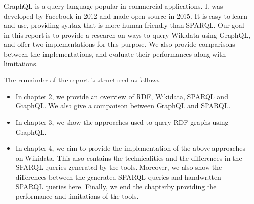 GraphQL is a query language popular in commercial applications. It was developed by Facebook in 2012 and made open source in 2015. It is easy to learn and use, providing syntax that is more human friendly than SPARQL. Our goal in this report is to provide a research on ways to query Wikidata using GraphQL, and offer two implementations for this purpose. We also provide comparisons between the implementations, and evaluate their performances along with limitations.


The remainder of the report is structured as follows.
\begin{itemize}
	\item In chapter 2, we provide an overview of RDF, Wikidata, SPARQL and GraphQL. We also give a comparison between GraphQL and SPARQL. 
	\item In chapter 3, we show the approaches used to query RDF graphs using GraphQL.
	\item In chapter 4, we aim to provide the implementation of the above approaches on Wikidata. This also contains the technicalities and the differences in the SPARQL queries generated by the tools. Moreover, we also show the differences between the generated SPARQL queries and handwritten SPARQL queries here. Finally, we end the chapterby providing the performance and limitations of the tools.
\end{itemize}